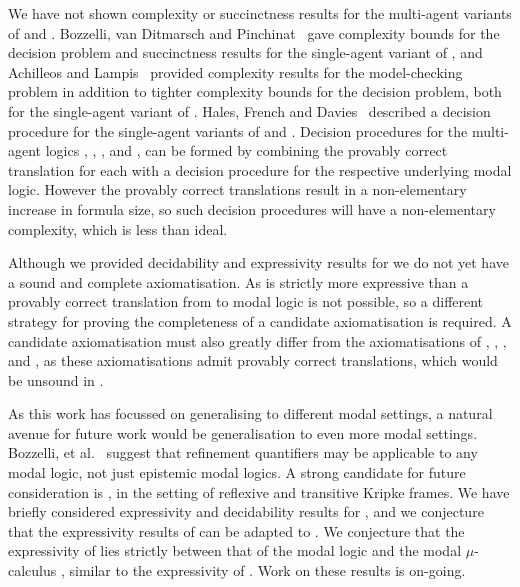 We have not shown complexity or succinctness results for the multi-agent variants of \logicRml{} and \logicAaml{}.
Bozzelli, van Ditmarsch and Pinchinat~\cite{bozzelli:2014a} gave complexity bounds for the decision problem and succinctness results for the single-agent variant of \logicRmlK{}, and Achilleos and Lampis~\cite{achilleos:2013} provided complexity results for the model-checking problem in addition to tighter complexity bounds for the decision problem, both for the single-agent variant of \logicRmlK{}.
Hales, French and Davies~\cite{hales:2011b} described a decision procedure for the single-agent variants of \logicRmlKD{} and \logicRmlS{}.
Decision procedures for the multi-agent logics \logicRmlK{}, \logicRmlKFF{}, \logicRmlKD{}, and \logicRmlS{}, can be formed by combining the provably correct translation for each with a decision procedure for the respective underlying modal logic.
However the provably correct translations result in a non-elementary increase in formula size, so such decision procedures will have a non-elementary complexity, which is less than ideal.

Although we provided decidability and expressivity results for \logicRmlKF{} we do not yet have a sound and complete axiomatisation.
As \logicRmlKF{} is strictly more expressive than \logicKF{} a provably correct translation from \langRml{} to modal logic is not possible, so a different strategy for proving the completeness of a candidate axiomatisation is required.
A candidate axiomatisation must also greatly differ from the axiomatisations of \logicRmlK{}, \logicRmlKFF{}, \logicRmlKD{}, and \logicRmlS{}, as these axiomatisations admit provably correct translations, which would be unsound in \logicRmlKF{}.

As this work has focussed on generalising \logicRml{} to different modal settings, a natural avenue for future work would be generalisation to even more modal settings.
Bozzelli, et al.~\cite{bozzelli:2014b} suggest that refinement quantifiers may be applicable to any modal logic, not just epistemic modal logics.
A strong candidate for future consideration is \logicRmlSF{}, in the setting of reflexive and transitive Kripke frames.
We have briefly considered expressivity and decidability results for \logicRmlSF{}, and we conjecture that the expressivity results of \logicRmlKF{} can be adapted to \logicRmlSF{}.
We conjecture that the expressivity of \logicRmlSF{} lies strictly between that of the modal logic \logicSF{} and the modal $\mu$-calculus \logicMuSF{}, similar to the expressivity of \logicRmlKF{}.
Work on these results is on-going.

